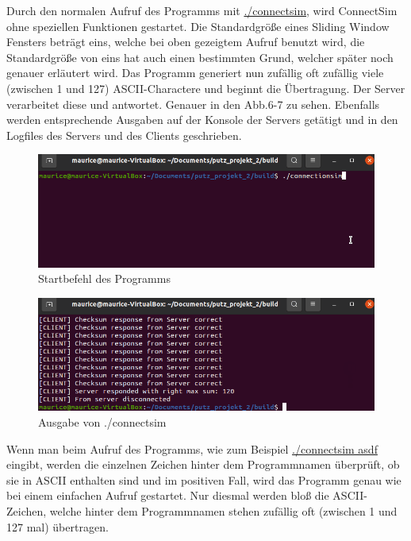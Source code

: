 \documentclass{article}
\begin{document}
Durch den normalen Aufruf des Programms mit \underline{./connectsim}, wird ConnectSim ohne speziellen Funktionen gestartet. Die Standardgröße eines Sliding Window Fensters beträgt eins, welche bei oben gezeigtem Aufruf benutzt wird, die Standardgröße von eins hat auch einen bestimmten Grund, welcher später noch genauer erläutert wird. Das Programm generiert nun zufällig oft zufällig viele (zwischen 1 und 127) ASCII-Charactere und beginnt die Übertragung. Der Server verarbeitet diese und antwortet. Genauer in den Abb.6-7 zu sehen. Ebenfalls werden entsprechende Ausgaben auf der Konsole der Servers getätigt und in den Logfiles des Servers und des Clients geschrieben.

\begin{center}
\begin{figure}[h]
    \centering
    \includegraphics[width=\textwidth]{connectsimclient.png}
    \caption{Startbefehl des Programms}
\end{figure}
\end{center}

\break

\begin{center}
\begin{figure}[h]
    \centering
    \includegraphics[width=\textwidth]{connectsimcliente.png}
    \caption{Ausgabe von ./connectsim}
\end{figure}
\end{center}

Wenn man beim Aufruf des Programms, wie zum Beispiel  \underline{./connectsim asdf} eingibt, werden die einzelnen Zeichen hinter dem Programmnamen überprüft, ob sie in ASCII enthalten sind und im positiven Fall, wird das Programm genau wie bei einem einfachen Aufruf gestartet. Nur diesmal werden bloß die ASCII-Zeichen, welche hinter dem Programmnamen stehen zufällig oft (zwischen 1 und 127 mal) übertragen.
\newline
\end{document}
